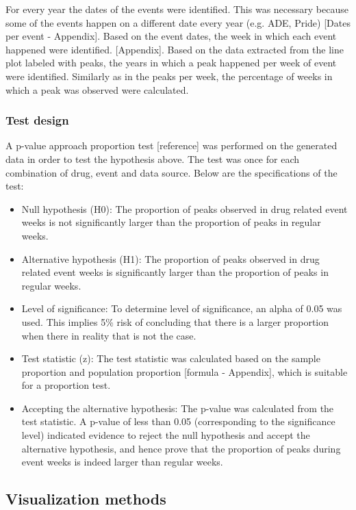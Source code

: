 For every year the dates of the events were identified. This was necessary because some of the events happen on a different date every year (e.g. ADE, Pride) [Dates per event - Appendix]. Based on the event dates, the week in which each event happened were identified. [Appendix]. Based on the data extracted from the line plot labeled with peaks, the years in which a peak happened per week of event were identified. Similarly as in the peaks per week, the percentage of weeks in which a peak was observed were calculated.

\subsubsection{Test design}

A p-value approach proportion test [reference] was performed on the generated data in order to test the hypothesis above. The test was once for each combination of drug, event and data source. Below are the specifications of the test:

\begin{itemize}
  \item Null hypothesis (H0): The proportion of peaks observed in drug related event weeks is not significantly larger than the proportion of peaks in regular weeks.
  \item Alternative hypothesis (H1): The proportion of peaks observed in drug related event weeks is significantly larger than the proportion of peaks in regular weeks.
  \item Level of significance: To determine level of significance, an alpha of 0.05 was used. This implies 5\% risk of concluding that there is a larger proportion when there in reality that is not the case.
  \item Test statistic (z): The test statistic was calculated based on the sample proportion and population proportion  [formula - Appendix], which is suitable for a proportion test. 
  \item Accepting the alternative hypothesis: The p-value was calculated from the test statistic. A p-value of less than 0.05 (corresponding to the significance level) indicated evidence to reject the null hypothesis and accept the alternative hypothesis, and hence prove that the proportion of peaks during event weeks is indeed larger than regular weeks.

\end{itemize}

\subsection{Visualization methods}

